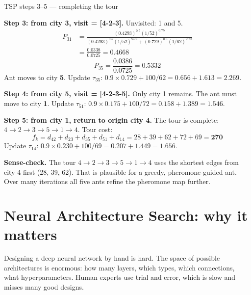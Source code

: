 \documentclass[a4paper,11pt]{article}
\begin{document}
\begin{worked}{TSP steps 3--5 --- completing the tour}

\begin{steps}
  \item \textbf{Step 3: from city 3, visit = [4-2-3].}
        Unvisited: 1 and 5.
        \begin{align*}
          P_{31} &= \frac{(0.4293)^{0.5}(1/52)^{0.75}}
                         {(0.4293)^{0.5}(1/52)^{0.75} + (0.729)^{0.5}(1/62)^{0.75}}\\
                 &= \frac{0.0338}{0.0725} = 0.4668
        \end{align*}
        \[
          P_{35} = \frac{0.0386}{0.0725} = \mathbf{0.5332}
        \]
        Ant moves to city \textbf{5}.
        Update $\tau_{35}$:
        $0.9 \times 0.729 + 100/62 = 0.656 + 1.613 = \mathbf{2.269}$.

  \item \textbf{Step 4: from city 5, visit = [4-2-3-5].}
        Only city 1 remains.
        The ant must move to city \textbf{1}.
        Update $\tau_{51}$:
        $0.9 \times 0.175 + 100/72 = 0.158 + 1.389 = \mathbf{1.546}$.

  \item \textbf{Step 5: from city 1, return to origin city 4.}
        The tour is complete: $4 \to 2 \to 3 \to 5 \to 1 \to 4$.
        Tour cost:
        \[
          f_k = d_{42} + d_{23} + d_{35} + d_{51} + d_{14}
               = 28 + 39 + 62 + 72 + 69 = \mathbf{270}
        \]
        Update $\tau_{14}$:
        $0.9 \times 0.230 + 100/69 = 0.207 + 1.449 = \mathbf{1.656}$.

  \item \textbf{Sense-check.}
        The tour $4\to2\to3\to5\to1\to4$ uses the shortest edges from
        city 4 first (28, 39, 62).
        That is plausible for a greedy, pheromone-guided ant.
        Over many iterations all five ants refine the pheromone map
        further.
\end{steps}
\end{worked}

\section{Neural Architecture Search: why it matters}

Designing a deep neural network by hand is hard.
The space of possible architectures is enormous: how many layers, which
types, which connections, what hyperparameters.
Human experts use trial and error, which is slow and misses many good
designs.
\end{document}
